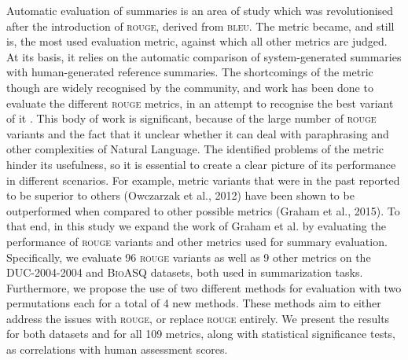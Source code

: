 \documentclass[11pt,a4paper]{article}
\newcommand{\rouge}{\textsc{rouge}\xspace}
\newcommand{\bleu}{\textsc{bleu}\xspace}
\newcommand{\bioasq}{\textsc{BioASQ}\xspace}
\newcommand{\duc}{\textsc{DUC-2004}\xspace}
\begin{document}
Automatic evaluation of summaries is an area of study which was revolutionised after the 
introduction of \rouge \cite{Lin:2004}, derived from \bleu. The metric became, and 
still is, the most used evaluation metric, against which all other metrics are judged. At its basis, 
it relies on the automatic comparison of system-generated summaries with human-generated 
reference summaries. 
The shortcomings of the metric though are widely recognised by the community, and work has been done 
to evaluate the different \rouge metrics, in an attempt to recognise the best variant of it . This
body of work is significant, because of the large number of \rouge variants and the fact that it 
unclear whether it can deal with paraphrasing and other complexities of Natural Language.
The identified problems of the metric hinder its usefulness, so it is essential to create a 
clear picture of its performance in different scenarios. For example, metric variants that were 
in the past reported to be superior to others (Owczarzak et al., 2012) have been shown to be 
outperformed when compared to other possible metrics (Graham et al., 2015).
To that end, in this study we expand the work of Graham et al.  by evaluating the performance 
of  \rouge variants and other metrics used for summary evaluation. Specifically, we evaluate 
96 \rouge variants as well as 9 other metrics on the \duc-2004 and \bioasq datasets, both used 
in summarization tasks. Furthermore, we propose the use of two different methods for evaluation 
with two permutations each for a total of 4 new methods. These methods aim to either address 
the issues with \rouge, or replace \rouge entirely. We present the results for both datasets 
and for all 109 metrics, along with statistical significance tests, as correlations with 
human assessment scores.
\end{document}
